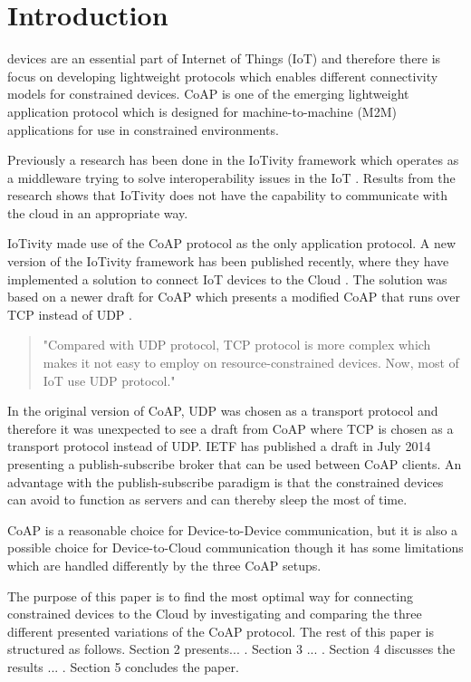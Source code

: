 \section{Introduction}
% 
% 
 devices are an essential part of Internet of Things (IoT) and therefore there is focus on developing lightweight protocols which enables different connectivity models for constrained devices.  
CoAP is one of the emerging lightweight application protocol which is designed for machine-to-machine (M2M) applications for use in constrained environments.   

Previously a research has been done in the IoTivity framework which operates as a middleware trying to solve interoperability issues in the IoT \cite{interoperabilityChallenge}. Results from the research shows that IoTivity does not have the capability to communicate with the cloud in an appropriate way. 

IoTivity made use of the CoAP protocol as the only application protocol. 
A new version of the IoTivity framework has been published recently, where they have implemented a solution to connect IoT devices to the Cloud \cite{iotivity1.1}. The solution was based on a newer draft for CoAP \cite{coapTCP} which presents a modified CoAP that runs over TCP instead of UDP \cite{coapUDP}.

\begin{quote}
	"Compared with UDP protocol, TCP protocol is more complex which makes it not easy to employ on resource-constrained devices. Now, most of IoT use UDP protocol." \cite{TCPvsUDP}
\end{quote}
In the original version of CoAP, UDP was chosen as a transport protocol and therefore it was unexpected to see a draft from CoAP where TCP is chosen as a transport protocol instead of UDP.
IETF has published a draft in July 2014 presenting a publish-subscribe broker that can be used between CoAP clients. An advantage with the publish-subscribe paradigm is that the constrained devices can avoid to function as servers and can thereby sleep the most of time.

CoAP is a reasonable choice for Device-to-Device communication,  but it is also a possible choice for Device-to-Cloud communication though it has some limitations which are handled differently by the three CoAP setups.

The purpose of this paper is to find the most optimal way for connecting constrained devices to the Cloud by investigating and comparing the three different presented variations of the CoAP protocol. The rest of this paper is structured as follows.  Section 2 presents... . Section 3 ... . Section 4 discusses the results ... . Section 5 concludes the paper.     
